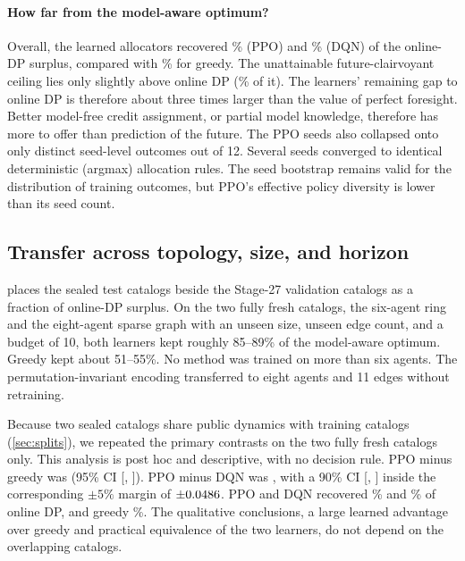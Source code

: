\documentclass[11pt,a4paper]{article}
\begin{document}
\paragraph{How far from the model-aware optimum?} Overall, the learned allocators recovered \fracPPO\% (PPO) and \fracDQN\% (DQN) of the online-DP surplus, compared with \fracGreedy\% for greedy. The unattainable future-clairvoyant ceiling lies only slightly above online DP (\fracFuture\% of it). The learners' remaining gap to online DP is therefore about three times larger than the value of perfect foresight. Better model-free credit assignment, or partial model knowledge, therefore has more to offer than prediction of the future. The PPO seeds also collapsed onto only \ppoDistinctSeedValues{} distinct seed-level outcomes out of 12. Several seeds converged to identical deterministic (argmax) allocation rules. The seed bootstrap remains valid for the distribution of training outcomes, but PPO's effective policy diversity is lower than its seed count.

\subsection{Transfer across topology, size, and horizon}\label{sec:transfer}

 places the sealed test catalogs beside the Stage-27 validation catalogs as a fraction of online-DP surplus. On the two fully fresh catalogs, the six-agent ring and the eight-agent sparse graph with an unseen size, unseen edge count, and a budget of 10, both learners kept roughly 85--89\% of the model-aware optimum. Greedy kept about 51--55\%. No method was trained on more than six agents. The permutation-invariant encoding transferred to eight agents and 11 edges without retraining.

Because two sealed catalogs share public dynamics with training catalogs (\cref{sec:splits}), we repeated the primary contrasts on the two fully fresh catalogs only. This analysis is post hoc and descriptive, with no decision rule. PPO minus greedy was \phPPOMinusGreedy{} (95\% CI [\phPPOMinusGreedyLo, \phPPOMinusGreedyHi]). PPO minus DQN was \phPPOMinusDqn, with a 90\% CI [\phPPOMinusDqnLoNinety, \phPPOMinusDqnHiNinety] inside the corresponding $\pm5\%$ margin of $\pm0.0486$. PPO and DQN recovered \phFracPPO\% and \phFracDQN\% of online DP, and greedy \phFracGreedy\%. The qualitative conclusions, a large learned advantage over greedy and practical equivalence of the two learners, do not depend on the overlapping catalogs.
\end{document}
